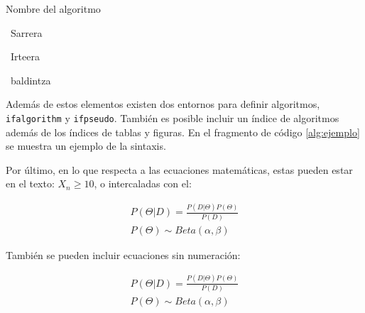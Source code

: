 \begin{ifalgorithm}[t]
	\begin{ifpseudo}{Nombre del algoritmo}
		\item	\In\ Sarrera
		\item	\Out\ Irteera
		\item	{}
		\item	{}
		\item	\EFor
		\item	\If\ baldintza \Then
		\item	{}
		\item	{}
		\item	\T{\Done}
		\item	\Else
		\item	\T{\Do}
		\item	{}
		\item	{}
		\item	\TT{\EFor}
		\item	{}
		\item	\EIf
		\item	{}
		\item	{}
		\item	\TT{\Return}
		\item	\T{\EIf}
	\end{ifpseudo}
	\caption{Ejemplo de pseudocódigo}\label{alg:ejemplo}
\end{ifalgorithm}

Además de estos elementos existen dos entornos para definir algoritmos, \texttt{ifalgorithm} y \texttt{ifpseudo}. También es posible incluir un índice de algoritmos además de los índices de tablas y figuras. En el fragmento de código \ref{alg:ejemplo} se muestra un ejemplo de la sintaxis.

Por último, en lo que respecta a las ecuaciones matemáticas, estas pueden estar en el texto: $X_n \geq 10$, o intercaladas con el:

\begin{eqnarray}
P(\Theta|D) = \frac{P(D|\Theta)P(\Theta)}{P(D)}\\
P(\Theta) \sim Beta(\alpha, \beta)
\end{eqnarray} 

También se pueden incluir ecuaciones sin numeración:

\begin{eqnarray*}
	P(\Theta|D) = \frac{P(D|\Theta)P(\Theta)}{P(D)}\\
	P(\Theta) \sim Beta(\alpha, \beta)
\end{eqnarray*} 



